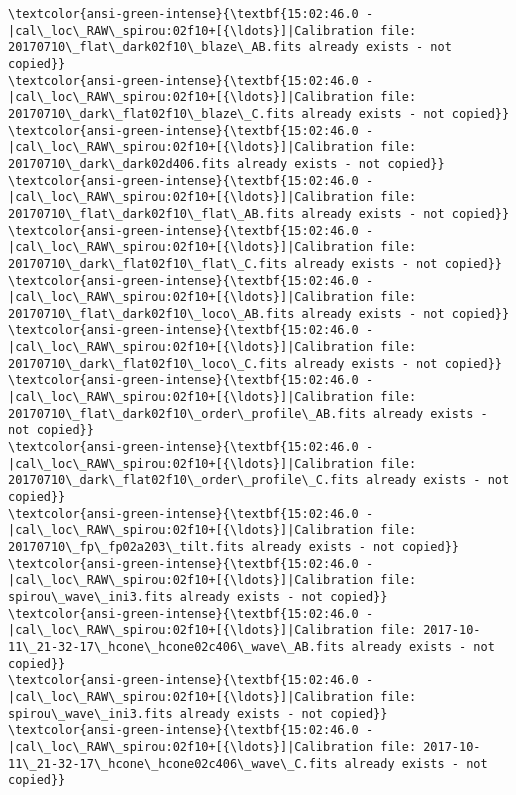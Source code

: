 \documentclass[11pt]{article}
\begin{document}
\begin{Verbatim}[commandchars=\\\{\}]
\textcolor{ansi-green-intense}{\textbf{15:02:46.0 -   |cal\_loc\_RAW\_spirou:02f10+[{\ldots}]|Calibration file: 20170710\_flat\_dark02f10\_blaze\_AB.fits already exists - not copied}}
\textcolor{ansi-green-intense}{\textbf{15:02:46.0 -   |cal\_loc\_RAW\_spirou:02f10+[{\ldots}]|Calibration file: 20170710\_dark\_flat02f10\_blaze\_C.fits already exists - not copied}}
\textcolor{ansi-green-intense}{\textbf{15:02:46.0 -   |cal\_loc\_RAW\_spirou:02f10+[{\ldots}]|Calibration file: 20170710\_dark\_dark02d406.fits already exists - not copied}}
\textcolor{ansi-green-intense}{\textbf{15:02:46.0 -   |cal\_loc\_RAW\_spirou:02f10+[{\ldots}]|Calibration file: 20170710\_flat\_dark02f10\_flat\_AB.fits already exists - not copied}}
\textcolor{ansi-green-intense}{\textbf{15:02:46.0 -   |cal\_loc\_RAW\_spirou:02f10+[{\ldots}]|Calibration file: 20170710\_dark\_flat02f10\_flat\_C.fits already exists - not copied}}
\textcolor{ansi-green-intense}{\textbf{15:02:46.0 -   |cal\_loc\_RAW\_spirou:02f10+[{\ldots}]|Calibration file: 20170710\_flat\_dark02f10\_loco\_AB.fits already exists - not copied}}
\textcolor{ansi-green-intense}{\textbf{15:02:46.0 -   |cal\_loc\_RAW\_spirou:02f10+[{\ldots}]|Calibration file: 20170710\_dark\_flat02f10\_loco\_C.fits already exists - not copied}}
\textcolor{ansi-green-intense}{\textbf{15:02:46.0 -   |cal\_loc\_RAW\_spirou:02f10+[{\ldots}]|Calibration file: 20170710\_flat\_dark02f10\_order\_profile\_AB.fits already exists - not copied}}
\textcolor{ansi-green-intense}{\textbf{15:02:46.0 -   |cal\_loc\_RAW\_spirou:02f10+[{\ldots}]|Calibration file: 20170710\_dark\_flat02f10\_order\_profile\_C.fits already exists - not copied}}
\textcolor{ansi-green-intense}{\textbf{15:02:46.0 -   |cal\_loc\_RAW\_spirou:02f10+[{\ldots}]|Calibration file: 20170710\_fp\_fp02a203\_tilt.fits already exists - not copied}}
\textcolor{ansi-green-intense}{\textbf{15:02:46.0 -   |cal\_loc\_RAW\_spirou:02f10+[{\ldots}]|Calibration file: spirou\_wave\_ini3.fits already exists - not copied}}
\textcolor{ansi-green-intense}{\textbf{15:02:46.0 -   |cal\_loc\_RAW\_spirou:02f10+[{\ldots}]|Calibration file: 2017-10-11\_21-32-17\_hcone\_hcone02c406\_wave\_AB.fits already exists - not copied}}
\textcolor{ansi-green-intense}{\textbf{15:02:46.0 -   |cal\_loc\_RAW\_spirou:02f10+[{\ldots}]|Calibration file: spirou\_wave\_ini3.fits already exists - not copied}}
\textcolor{ansi-green-intense}{\textbf{15:02:46.0 -   |cal\_loc\_RAW\_spirou:02f10+[{\ldots}]|Calibration file: 2017-10-11\_21-32-17\_hcone\_hcone02c406\_wave\_C.fits already exists - not copied}}

    \end{Verbatim}
\end{document}
